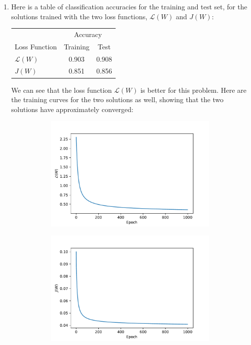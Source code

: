 \documentclass{article}
\begin{document}
\begin{enumerate}
        \item Here is a table of classification accuracies for the training and test set, for the solutions trained with the two loss functions, $\mathcal{L}(W)$ and $J(W)$:
        \begin{center}
                \begin{tabular}{l c c}
                        \, & \multicolumn{2}{c}{Accuracy} \\
                        Loss Function & Training & Test\vspace{1mm}\\
                        $\mathcal{L}(W)$ & 0.903 & 0.908 \\ 
                        $J(W)$ & 0.851 & 0.856 \\
               \end{tabular}
        \end{center}
        We can see that the loss function $\mathcal{L}(W)$ is better for this problem.
        Here are the training curves for the two solutions as well, showing that the two solutions have approximately converged:
        \begin{figure}[h]
                \centering
                \begin{subfigure}{0.45\textwidth}
                        \includegraphics[width=\textwidth]{code/B4_celoss.pdf}
                \end{subfigure}
                \begin{subfigure}{0.45\textwidth}
                        \includegraphics[width=\textwidth]{code/B4_mseloss.pdf}

\end{subfigure}
\end{figure}
\end{enumerate}
\end{document}
